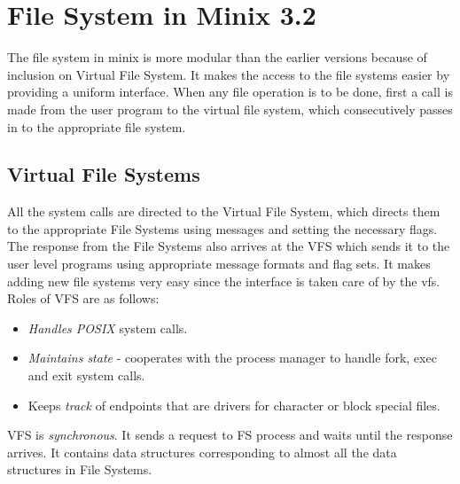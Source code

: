  \newpage

 \section{File System in Minix 3.2}
 The file system in minix is more modular than the earlier versions because of
 inclusion on Virtual File System. It makes the access to the file systems 
easier by providing a uniform interface. When any file operation is to be done,
first a call is made from the user program to the virtual file system, which
consecutively passes in to the appropriate file system.

 

\subsection{Virtual File Systems}

All the system calls are directed to the Virtual File System, which directs them
to the appropriate File Systems using messages and setting the necessary flags.
The response from the File Systems also arrives at the VFS which sends it to the
user level programs using appropriate message formats and flag sets.
 It makes adding new file systems very easy since the interface is taken care of
 by the vfs. Roles of VFS are as follows:
\begin{itemize}
\item \emph{Handles POSIX} system calls.
\item \emph{Maintains state} - cooperates with the process manager to handle fork, exec
and exit system calls.
\item Keeps \emph{track} of endpoints that are drivers for character or block special
files.
\end{itemize}
 VFS is \emph{synchronous}. It sends a request to FS process and
waits until the response arrives. It contains data structures corresponding to almost all the data structures in File Systems.

